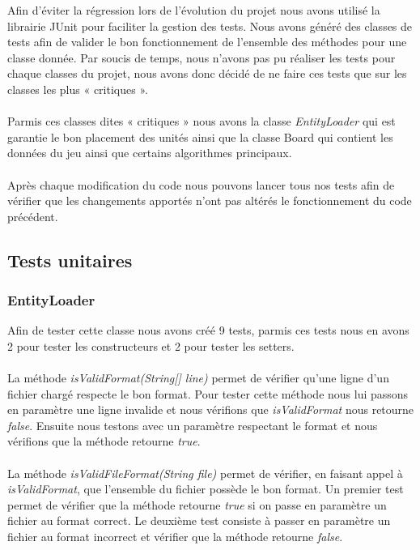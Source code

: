 		Afin d'éviter la régression lors de l'évolution du projet nous avons utilisé la librairie JUnit pour faciliter la gestion des tests. 
		Nous avons généré des classes de tests afin de valider le bon fonctionnement de l'ensemble des méthodes pour une classe donnée.
		Par soucis de temps, nous n'avons pas pu réaliser les tests pour chaque classes du projet, nous avons donc décidé de ne faire ces tests que sur les classes les plus « critiques ».\\ \\
		Parmis ces classes dites « critiques » nous avons la classe {\itshape EntityLoader} qui est garantie le bon placement des unités ainsi que la classe Board qui contient les données du jeu
		ainsi que certains algorithmes principaux.
		\\ \\
		Après chaque modification du code nous pouvons lancer tous nos tests afin de vérifier que les changements apportés n'ont pas altérés le fonctionnement du code précédent.
		
		\subsection{Tests unitaires}

			\subsubsection{EntityLoader}
				
				Afin de tester cette classe nous avons créé 9 tests, parmis ces tests nous en avons 2 pour tester les constructeurs et 2 pour tester les setters.\\ \\
				La méthode {\itshape isValidFormat(String[] line)} permet de vérifier qu'une ligne d'un fichier chargé respecte le bon format.
				Pour tester cette méthode nous lui passons en paramètre une ligne invalide et nous vérifions que {\itshape isValidFormat} nous retourne {\itshape false}.
				Ensuite nous testons avec un paramètre respectant le format et nous vérifions que la méthode retourne {\itshape true}.\\ \\

				La méthode {\itshape isValidFileFormat(String file)} permet de vérifier, en faisant appel à {\itshape isValidFormat}, que l'ensemble du fichier possède le bon format.
				Un premier test permet de vérifier que la méthode retourne {\itshape true} si on passe en paramètre un fichier au format correct.
				Le deuxième test consiste à passer en paramètre un fichier au format incorrect et vérifier que la méthode retourne {\itshape false}.\\ \\

